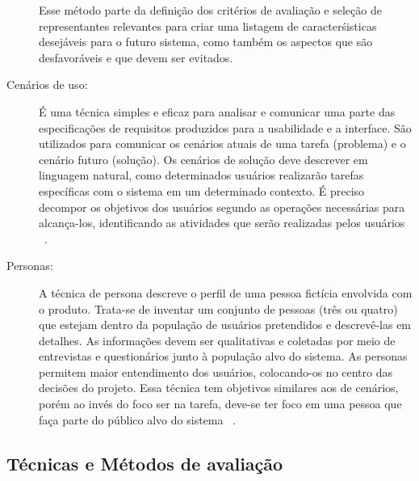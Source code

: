 \begin{description}
	Esse método parte da definição dos critérios de avaliação e seleção de representantes relevantes para criar uma listagem de caracterśisticas desejáveis para o futuro sistema, como também os aspectos que são desfavoráveis e que devem ser evitados.

\item[Cenários de uso:]

	É uma técnica simples e eficaz para analisar e comunicar uma parte das especificações de requisitos produzidos para a usabilidade e a interface. São utilizados para comunicar os cenários atuais de uma tarefa (problema) e o cenário futuro (solução). Os cenários de solução deve descrever em linguagem natural, como determinados usuários realizarão tarefas específicas com o sistema em um determinado contexto. É preciso decompor os objetivos dos usuários segundo as operações necessárias para alcança-los, identificando as atividades que serão realizadas pelos usuários ~\cite{cybis2010}.

\item[Personas:]

	A técnica de persona descreve o perfil de uma pessoa fictícia envolvida com o produto. Trata-se de inventar um conjunto de pessoas (três ou quatro) que estejam dentro da população de usuários pretendidos e descrevê-las em detalhes.
%
	As informações devem ser qualitativas e coletadas por meio de entrevistas e questionários junto à população alvo do sistema. As personas permitem maior entendimento dos usuários, colocando-os no centro das decisões do projeto. Essa técnica tem objetivos similares aos de cenários, porém ao invés do foco ser na tarefa, deve-se ter foco em uma pessoa que faça parte do público alvo do sistema ~\cite{cybis2010}.

\end{description}

\subsection{Técnicas e Métodos de avaliação}

